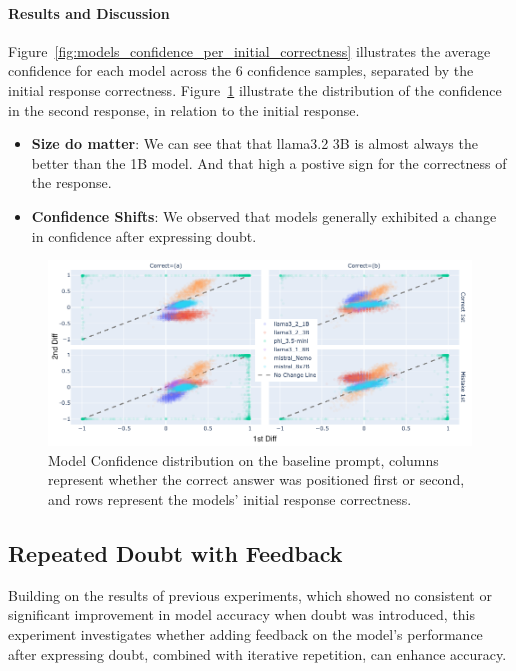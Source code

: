 \paragraph{Results and Discussion}

Figure~\ref{fig:models_confidence_per_initial_correctness} illustrates the average confidence for each model across the 6 confidence samples, separated by the initial response correctness. Figure~\ref{fig:models_confidence} illustrate the distribution of the confidence in the second response, in relation to the initial response.
\begin{itemize}
  \item \textbf{Size do matter}: We can see that that llama3.2 3B is almost always the better than the 1B model. And that high a postive sign for the correctness of the response.
  \item \textbf{Confidence Shifts}: We observed that models generally exhibited a change in confidence after expressing doubt.
\end{itemize}

\begin{figure}[ht!]
  \includegraphics[width=\textwidth]{img/first_vs_last_logit_diff_on_baseline_copy.png}
  \caption{Model Confidence distribution on the baseline prompt, columns represent whether the correct answer was positioned first or second, and rows represent the models' initial response correctness.}
  \label{fig:models_confidence}
\end{figure}

\subsection{Repeated Doubt with Feedback}

Building on the results of previous experiments, which showed no consistent or significant improvement in model accuracy when doubt was introduced, this experiment investigates whether adding feedback on the model's performance after expressing doubt, combined with iterative repetition, can enhance accuracy.

